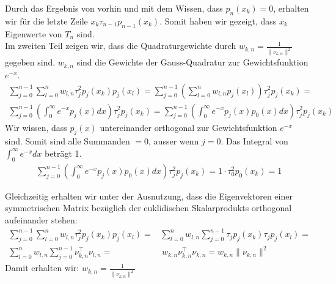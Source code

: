 Durch das Ergebnis von vorhin und mit dem Wissen, dass $p_{n}(x_{k})=0$, erhalten wir für die letzte Zeile $x_{k}\tau_{n-1}p_{n-1}(x_{k})$. Somit haben wir gezeigt, dass $x_{k}$ Eigenwerte von $T_{n}$ sind. \\ 
Im zweiten Teil zeigen wir, dass die Quadraturgewichte durch $w_{k,n} = \frac{1}{\lVert\nu_{k,n}\rVert^2}$ gegeben sind. $w_{k,n}$ sind die Gewichte der Gauss-Quadratur zur Gewichtsfunktion $e^{-x}$.
\begin{align*}
    \sum_{j=0}^{n-1}\sum_{l=0}^{n}w_{l,n}\tau_j^2p_j(x_k)p_j(x_l)= \sum_{j=0}^{n-1}\left(\sum_{l=0}^{n}w_{l,n}p_j(x_l)\right)\tau_j^2p_j(x_k) = \\
    \sum_{j=0}^{n-1}\left(\int_{0}^{\infty}e^{-x}p_{j}(x)dx\right)\tau_j^2p_j(x_k) = \sum_{j=0}^{n-1}\left(\int_{0}^{\infty}e^{-x}p_{j}(x)p_{0}(x)dx\right)\tau_j^2p_j(x_k)
\end{align*}
Wir wissen, dass $p_{j}(x)$ untereinander orthogonal zur Gewichtsfunktion $e^{-x}$ sind. Somit sind alle Summanden $=0$, ausser wenn $j=0$. Das Integral von $\int_{0}^{\infty}e^{-x}dx$ beträgt 1.
\begin{align*}
 \sum_{j=0}^{n-1}\left(\int_{0}^{\infty}e^{-x}p_{j}(x)p_{0}(x)dx\right)\tau_j^2p_j(x_k)=1\cdot\tau_{0}^{2}p_{0}(x_{k})=1   
\end{align*}

Gleichzeitig erhalten wir unter der Ausnutzung, dass die Eigenvektoren einer symmetrischen Matrix bezüglich der euklidischen Skalarprodukts orthogonal aufeinander stehen:
\begin{align*}
     \sum_{j=0}^{n-1}\sum_{l=0}^{n}w_{l,n}\tau_j^2p_j(x_k)p_j(x_l) = & \sum_{l=0}^{n}w_{l,n}\sum_{j=0}^{n-1}\tau_jp_j(x_k)\tau_jp_j(x_l) = \\
     \sum_{l=0}^{n}w_{l,n}\sum_{j=0}^{n-1}\nu_{k,n}^{\top}\nu_{l,n} = &
      ~w_{k,n}\nu_{k,n}^{\top}\nu_{k,n} = w_{k,n}\lVert\nu_{k,n}\rVert^2
\end{align*}
Damit erhalten wir: $w_{k,n} = \frac{1}{\lVert\nu_{k,n}\rVert^2}$

